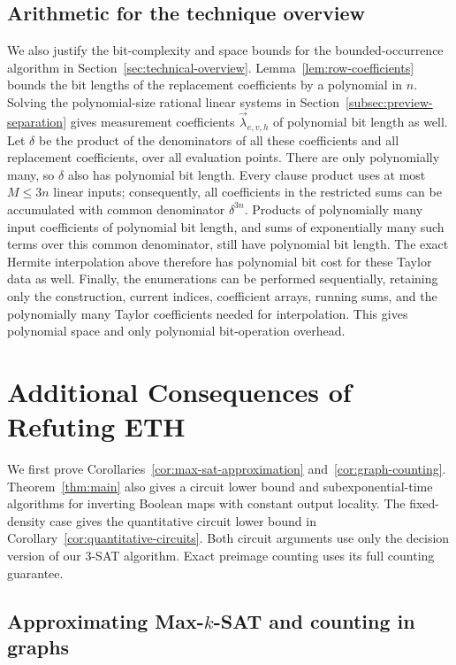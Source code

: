 \documentclass[11pt,reqno]{amsart}
\numberwithin{equation}{section}
\theoremstyle{definition}\newtheorem{definition}[theorem]{Definition}
\theoremstyle{remark}\newtheorem{remark}[theorem]{Remark}
\renewcommand{\le}{\leqslant}
\begin{document}
\subsection{Arithmetic for the technique overview}
\label{subsec:overview-arithmetic}
We also justify the bit-complexity and space bounds for the
bounded-occurrence algorithm in Section~\ref{sec:technical-overview}.
Lemma~\ref{lem:row-coefficients} bounds the bit lengths of the
replacement coefficients by a polynomial in $n$. Solving the
polynomial-size rational linear systems in
Section~\ref{subsec:preview-separation} gives measurement
coefficients $\vec\lambda_{e,v,h}$ of polynomial bit length as well.
Let $\delta$ be the product of the denominators of all these
coefficients and all replacement coefficients, over all evaluation
points. There are only polynomially many, so $\delta$ also has
polynomial bit length. Every clause product uses at most $M\le3n$
linear inputs; consequently, all coefficients in the restricted
sums can be accumulated with common denominator $\delta^{3n}$.
Products of polynomially many input coefficients of polynomial
bit length, and sums of exponentially many such terms over this
common denominator, still have polynomial bit length. The exact
Hermite interpolation above therefore has polynomial bit cost
for these Taylor data as well. Finally, the enumerations can be
performed sequentially, retaining only the construction, current
indices, coefficient arrays, running sums, and the polynomially
many Taylor coefficients needed for interpolation. This gives
polynomial space and only polynomial bit-operation overhead.

\raggedbottom

\section{Additional Consequences of Refuting ETH}\label{app:consequences}
We first prove Corollaries~\ref{cor:max-sat-approximation}
and~\ref{cor:graph-counting}. Theorem~\ref{thm:main} also gives a
circuit lower bound and
subexponential-time algorithms for inverting Boolean maps with constant
output locality. The fixed-density case gives the quantitative circuit
lower bound in Corollary~\ref{cor:quantitative-circuits}. Both circuit arguments use
only the decision version of our $3$-SAT algorithm. Exact preimage
counting uses its full counting guarantee.

\subsection{Approximating \texorpdfstring{Max-$k$-SAT}{Max-k-SAT} and counting in graphs}\label{subsec:consequence-proofs}
\end{document}
